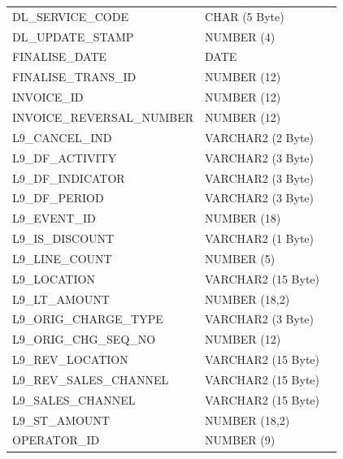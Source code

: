 \documentclass[12pt,twoside]{article}
\begin{document}
\begin{longtable}{lll}
 DL\_SERVICE\_CODE             &  CHAR (5 Byte)       &                        \\
 DL\_UPDATE\_STAMP             &  NUMBER (4)          &                        \\
 FINALISE\_DATE                &  DATE                &                        \\
 FINALISE\_TRANS\_ID           &  NUMBER (12)         &                        \\
 INVOICE\_ID                   &  NUMBER (12)         &                        \\
 INVOICE\_REVERSAL\_NUMBER     &  NUMBER (12)         &                        \\
 L9\_CANCEL\_IND               &  VARCHAR2 (2 Byte)   &                        \\
 L9\_DF\_ACTIVITY              &  VARCHAR2 (3 Byte)   &                        \\
 L9\_DF\_INDICATOR             &  VARCHAR2 (3 Byte)   &                        \\
 L9\_DF\_PERIOD                &  VARCHAR2 (3 Byte)   &                        \\
 L9\_EVENT\_ID                 &  NUMBER (18)         &                        \\
 L9\_IS\_DISCOUNT              &  VARCHAR2 (1 Byte)   &                        \\
 L9\_LINE\_COUNT               &  NUMBER (5)          &                        \\
 L9\_LOCATION                  &  VARCHAR2 (15 Byte)  &                        \\
 L9\_LT\_AMOUNT                &  NUMBER (18,2)       &                        \\
 L9\_ORIG\_CHARGE\_TYPE        &  VARCHAR2 (3 Byte)   &                        \\
 L9\_ORIG\_CHG\_SEQ\_NO        &  NUMBER (12)         &                        \\
 L9\_REV\_LOCATION             &  VARCHAR2 (15 Byte)  &                        \\
 L9\_REV\_SALES\_CHANNEL       &  VARCHAR2 (15 Byte)  &                        \\
 L9\_SALES\_CHANNEL            &  VARCHAR2 (15 Byte)  &                        \\
 L9\_ST\_AMOUNT                &  NUMBER (18,2)       &                        \\
 OPERATOR\_ID                  &  NUMBER (9)          &                        \\

\end{longtable}
\end{document}
